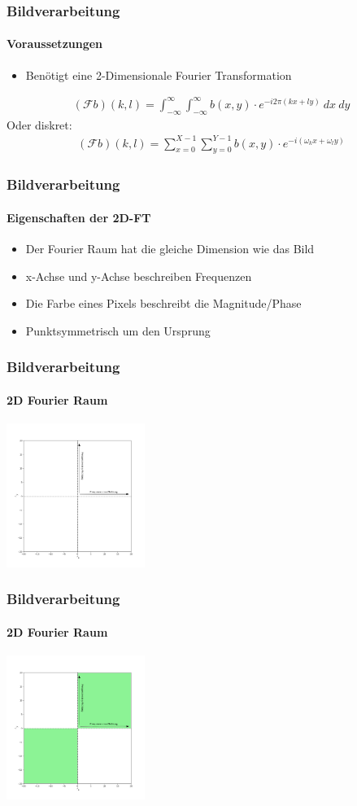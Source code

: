 \begin{frame}
    \frametitle{Bildverarbeitung}
    \framesubtitle{Voraussetzungen}

    \begin{itemize}
        \item Benötigt eine 2-Dimensionale Fourier Transformation
    \end{itemize}
    \begin{align*}
        (\mathcal{F} b)(k, l)=\int_{-\infty}^{\infty}{\int_{-\infty}^{\infty}{b(x, y)\cdot e^{-i2\pi (kx+ly)} \ dx}\ dy}
    \end{align*}
    Oder diskret:
    \begin{align*}
        (\mathcal{F} b)(k, l)=\sum_{x=0}^{X-1}{\sum_{y=0}^{Y-1}{b(x,y)\cdot e^{-i(\omega_kx+\omega_ly)}}}
    \end{align*}
\end{frame}

\begin{frame}
    \frametitle{Bildverarbeitung}
    \framesubtitle{Eigenschaften der 2D-FT}

    \begin{itemize}
        \item Der Fourier Raum hat die gleiche Dimension wie das Bild
        \item x-Achse und y-Achse beschreiben Frequenzen
        \item Die Farbe eines Pixels beschreibt die Magnitude/Phase
        \item Punktsymmetrisch um den Ursprung
    \end{itemize}
\end{frame}

\begin{frame}
    \frametitle{Bildverarbeitung}
    \framesubtitle{2D Fourier Raum}
    \centering
    \includegraphics[width=170px]{images/04-applications-fourier-space-empty.png}
\end{frame}

\begin{frame}
    \frametitle{Bildverarbeitung}
    \framesubtitle{2D Fourier Raum}
    \centering
    \includegraphics[width=170px]{images/04-applications-fourier-space-empty-1.png}
\end{frame}

